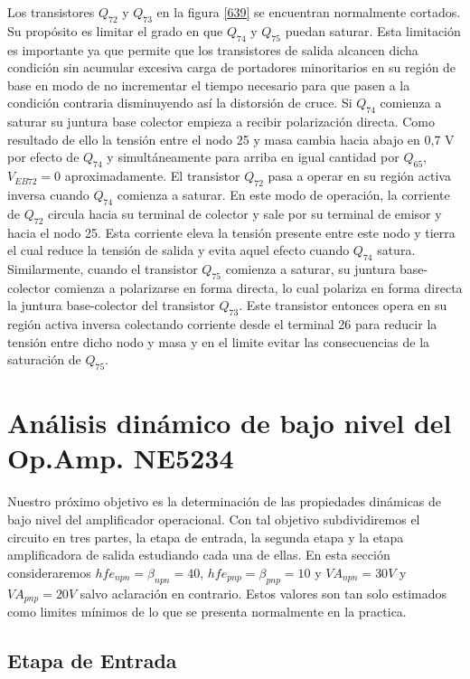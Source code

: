 \documentclass[12pt,a4paper,final,headinclude,footinclude,BCOR5mm]{scrartcl}
\begin{document}
Los transistores $Q_{72}$ y $Q_{73}$ en la figura \ref{639} se encuentran normalmente cortados. Su propósito es limitar el grado en que $Q_{74}$ y $Q_{75}$ puedan saturar. Esta limitación es importante ya que permite que los transistores de salida alcancen dicha condición sin acumular excesiva carga de portadores minoritarios en su región de base en modo de no incrementar el tiempo necesario para que pasen a la condición contraria disminuyendo así la distorsión de cruce. Si $Q_{74}$ comienza a saturar su juntura base colector empieza a recibir polarización directa. Como resultado de ello la tensión entre el nodo 25 y masa cambia hacia abajo en 0,7 V por efecto de $Q_{74}$ y simultáneamente para arriba en igual cantidad por $Q_{65}$, $V_{EB72} = 0$ aproximadamente. El transistor $Q_{72}$ pasa a operar en su región activa inversa cuando $Q_{74}$ comienza a saturar. En este modo de operación, la corriente de $Q_{72}$ circula hacia su terminal de colector y sale por su terminal de emisor y hacia el nodo 25. Esta corriente eleva la tensión presente entre este nodo y tierra el cual reduce la tensión de salida y evita aquel efecto cuando $Q_{74}$ satura. Similarmente, cuando el transistor $Q_{75}$ comienza a saturar, su juntura base-colector comienza a polarizarse en forma directa, lo cual polariza en forma directa la juntura base-colector del transistor $Q_{73}$. Este transistor entonces opera en su región activa inversa colectando corriente desde el terminal 26 para reducir la tensión entre dicho nodo y masa y en el limite evitar las consecuencias de la saturación de $Q_{75}$. 

\section{Análisis dinámico de bajo nivel del Op.Amp. NE5234}

Nuestro próximo objetivo es la determinación de las propiedades dinámicas  de bajo nivel del amplificador operacional. Con tal objetivo subdividiremos el circuito en tres partes, la etapa de entrada, la segunda etapa y la etapa amplificadora de salida estudiando cada una de ellas. En esta sección consideraremos $hfe_{npn} = \beta_{npn} = 40$, $hfe_{pnp} = \beta_{pnp} = 10$ y $VA_{npn} = 30 V$ y  $VA_{pnp} = 20 V$ salvo aclaración en contrario. Estos valores son tan solo estimados como limites mínimos de lo que se presenta normalmente en la practica.

\subsection{Etapa de Entrada}
\end{document}
